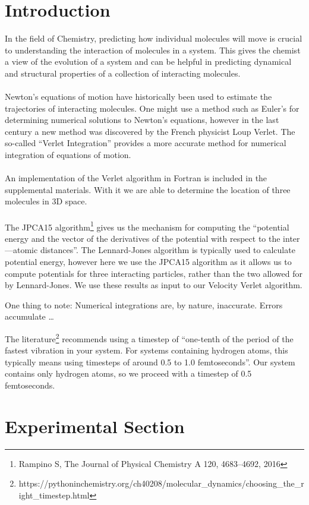 \documentclass[letterpaper,11pt,leqno]{article}
\begin{document}
\section{Introduction}\label{s:introduction}
In the field of Chemistry, predicting how individual molecules will move is crucial to 
understanding the interaction of molecules in a system.  This gives the chemist a view
of the evolution of a system and can be helpful in predicting dynamical and structural 
properties of a collection of interacting molecules.
\\~\\
Newton's equations of motion have historically been used to estimate the trajectories of 
interacting molecules.  One might use a method such as Euler's for determining numerical 
solutions to Newton's equations, however in the last century a new method was 
discovered by the French physicist Loup Verlet.  The so-called ``Verlet Integration'' provides
a more accurate method for numerical integration of equations of motion.
\\~\\
An implementation of the Verlet algorithm in Fortran is included in the supplemental 
materials.  With it we are able to determine the location of three molecules in 3D space.
\\~\\
The JPCA15 algorithm\footnote{Rampino S, The Journal of Physical Chemistry A 120, 4683--4692,
2016} gives us the mechanism for computing the ``potential energy and the vector of the
derivatives of the potential with respect to the inter---atomic distances''.
The Lennard-Jones algorithm is typically used to calculate potential energy, however here
we use the JPCA15 algorithm as it allows us to compute potentials for three interacting
particles, rather than the two allowed for by Lennard-Jones.
We use these results as input to our Velocity Verlet algorithm.

One thing to note: Numerical integrations are, by nature, inaccurate.  Errors accumulate \dots
 
The
literature\footnote{https://pythoninchemistry.org/ch40208/molecular\_dynamics/choosing\_the\_right\_timestep.html}
recommends using a timestep of ``one-tenth of the period of the fastest vibration in your
system.  For systems containing hydrogen atoms, this typically means using timesteps of around
0.5 to 1.0 femtoseconds''.  Our system contains only hydrogen atoms, so we proceed with a 
timestep of 0.5 femtoseconds.

\section{Experimental Section}\label{s:experiment}
\end{document}
